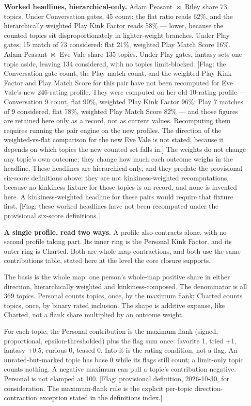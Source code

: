 \textbf{Worked headlines, hierarchical-only.} Adam Peasant $\bowtie$ Riley share
73 topics. Under Conversation gates, 45 count: the flat ratio reads
62\%, and the hierarchically weighted Play Kink Factor reads 58\% ---
lower, because the counted topics sit disproportionately in
lighter-weight branches. Under Play gates, 15 match of 73 considered:
flat 21\%, weighted Play Match Score 16\%. Adam Peasant $\bowtie$ Eve Vale share
135 topics. Under Play gates, fantasy sets one topic aside, leaving 134
considered, with no topics limit-blocked. {[}Flag: the Conversation-gate
count, the Play match count, and the weighted Play Kink Factor and Play
Match Score for this pair have not been recomputed for Eve Vale's new
246-rating profile. They were computed on her old 10-rating profile ---
Conversation 9 count, flat 90\%, weighted Play Kink Factor 96\%; Play 7
matches of 9 considered, flat 78\%, weighted Play Match Score 82\% ---
and those figures are retained here only as a record, not as current
values. Recomputing them requires running the pair engine on the new
profiles. The direction of the weighted-vs-flat comparison for the new
Eve Vale is not stated, because it depends on which topics the new
counted set falls in.{]} The weights do not change any topic's own
outcome; they change how much each outcome weighs in the headline. These
headlines are hierarchical-only, and they predate the provisional
six-score definitions above; they are not kinkiness-weighted
recomputations, because no kinkiness fixture for those topics is on
record, and none is invented here. A kinkiness-weighted headline for
these pairs would require that fixture first. {[}Flag: these worked
headlines have not been recomputed under the provisional six-score
definitions.{]}

\textbf{A single profile, read two ways.} A profile also contracts
alone, with no second profile taking part. Its inner ring is the
Personal Kink Factor, and its outer ring is Charted. Both are whole-map
contractions, and both use the same contributions table, stated here at
the level the core closure supports.

The basis is the whole map: one person's whole-map positive share in
either direction, hierarchically weighted and kinkiness-composed. The
denominator is all 369 topics. Personal counts topics, once, by the
maximum flank; Charted counts topics, once, by binary rated inclusion.
The shape is additive expanse, like Charted, not a flank share
multiplied by an outcome weight.

For each topic, the Personal contribution is the maximum flank (signed,
proportional, epsilon-thresholded) plus the flag sum once: favorite 1,
tried +1, fantasy +0.5, curious 0, teased 0. Into-it is the rating
condition, not a flag. An unrated-but-marked topic has base 0 while its
flags still count; a limit-only topic counts nothing. A negative maximum
can pull a topic's contribution negative. Personal is not clamped at
100. {[}Flag: provisional definition, 2026-10-30, for consideration. The
maximum-flank rule is the explicit per-topic direction-contraction
exception stated in the definitions index.{]}

